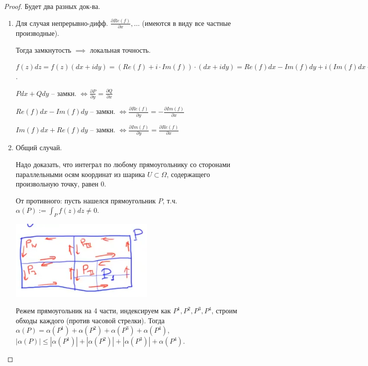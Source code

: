 \begin{proof}
    Будет два разных док-ва.

    \begin{enumerate}
        \item {
            Для случая непрерывно-дифф. $\frac{\partial Re(f)}{\partial x}, \dots$ (имеются в виду все частные производные).

            Тогда замкнутость $\implies$ локальная точность.

            $f(z) dz = f(z) (dx + i dy) = (Re(f) + i \cdot Im(f)) \cdot (dx + i dy) = Re(f) dx - Im(f) dy + i (Im (f) dx + Re(f) dy)$.

            $P dx + Q dy$ -- замкн. $\Leftrightarrow \frac{\partial P}{\partial y} = \frac{\partial Q}{\partial x}$

            $Re(f) dx - Im(f) dy$ -- замкн. $\Leftrightarrow \frac{\partial Re(f)}{\partial y} = - \frac{\partial Im(f)}{\partial x}$

            $Im(f) dx + Re(f) dy$ -- замкн. $\Leftrightarrow \frac{\partial Im(f)}{\partial y} = \frac{\partial Re(f)}{\partial x}$
        }
        \item {
            Общий случай.

            Надо доказать, что интеграл по любому прямоугольнику со сторонами параллельными осям координат из шарика $U \subset \Omega$, содержащего произвольную точку, равен 0.

            От противного: пусть нашелся прямоугольник $P$, т.ч. $\alpha (P) := \int_P {f(z) dz } \not = 0$.

            \begin{center}
                \includegraphics[width=7cm]{assets/04-functions-of-complex-variables/Cauchy-theorem-rectangle-partition.png}
            \end{center}


            Режем прямоугольник на 4 части, индексируем как $P^{1}, P^{2}, P^{3}, P^{4}$, строим обходы каждого (против часовой стрелки). Тогда $\alpha(P) = \alpha(P^{1}) + \alpha(P^{2}) + \alpha(P^{3}) + \alpha(P^{4})$, $|\alpha(P)| \leq |\alpha(P^{1})| + |\alpha(P^{2})| + |\alpha(P^{3})| + \alpha(P^{4})$.

}
\end{enumerate}
\end{proof}
